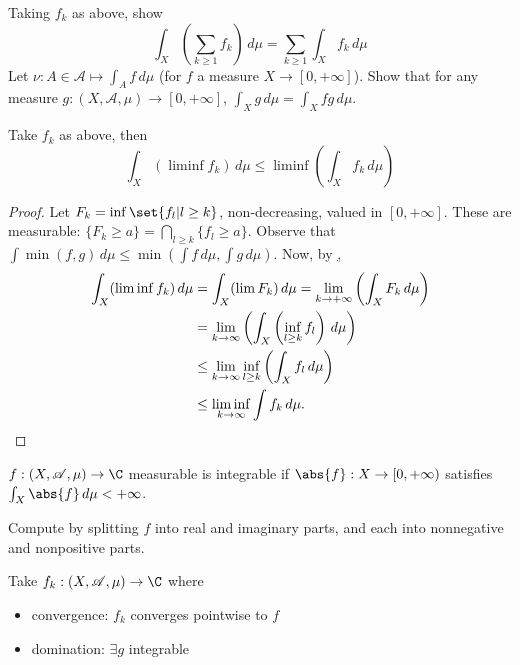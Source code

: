 \documentclass{article}
\begin{document}
\begin{ex}
    Taking $f_k$ as above, show
    \begin{equation*}
        \int_X \left(\sum_{k \geq 1} f_k\right) \, d\mu = \sum_{k \geq 1} \int_X f_k \, d\mu
    \end{equation*}
    Let $\nu: A \in \mathscr{A} \mapsto \int_A f \, d\mu$ (for $f$ a measure $X \to [0, +\infty]$).
    Show that for any measure $g: (X, \mathscr{A}, \mu) \to [0, +\infty]$, $\int_X g \, d\mu = \int_X fg \, d\mu$.
\end{ex}
\begin{thm}
    Take $f_k$ as above, then
    \begin{equation*}
        \int_X (\liminf f_k) \, d\mu \leq \liminf \left(\int_X f_k \, d\mu\right)
    \end{equation*}
\end{thm}

\begin{proof}
    Let $F_k = \inf\set{f_l | l \geq k}$, non-decreasing, valued in $[0, +\infty]$.
    These are measurable: $\{F_k \geq a\} = \bigcap_{l \geq k} \{f_l \geq a\}$.
    Observe that $\int \min(f, g) \, d\mu \leq \min(\int f \, d\mu, \int g \, d\mu)$.
    Now, by \hyperlink{thm:Beppo-Levi},
    \begin{align*}
        \int_X (\liminf f_k) \, d\mu &= \int_X (\lim F_k) \, d\mu = \lim_{k \to +\infty} \left(\int_X F_k \, d\mu\right) \\
                                     &= \lim_{k \to \infty} \left(\int_X \left( \inf_{l \geq k} f_l\right) \, d\mu\right) \\
                                     &\leq \lim_{k \to \infty} \inf_{l \geq k} \left(\int_X f_l \, d\mu\right)\\
                                     &\leq \liminf_{k \to \infty} \int f_k \, d\mu.\qedhere
    \end{align*}
\end{proof}
\begin{defi}[Integrable]
    $f: (X, \mathscr{A}, \mu) \to \C$ measurable is integrable if $\abs{f}: X \to [0, +\infty)$ satisfies $\int_X \abs{f} \, d\mu < +\infty$.
\end{defi}
Compute by splitting $f$ into real and imaginary parts, and each into nonnegative and nonpositive parts.

\begin{thm}
    Take $f_k: (X, \mathscr{A}, \mu) \to \C$ where
    \begin{itemize}
        \item convergence: $f_k$ converges pointwise to $f$
        \item domination: $\exists g$ integrable
    \end{itemize}
\end{thm}
\end{document}
